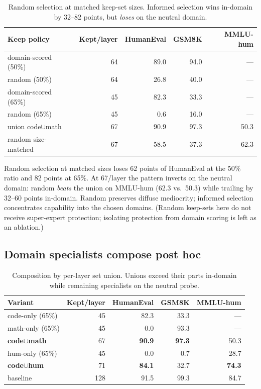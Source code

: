 \documentclass[11pt]{article}
\begin{document}
\begin{table}[h]
\centering
\begin{tabular}{lrrrr}
\toprule
Keep policy & Kept/layer & HumanEval & GSM8K & MMLU-hum \\
\midrule
domain-scored (50\%)   & 64 & 89.0 & 94.0 & --- \\
random (50\%)          & 64 & 26.8 & 40.0 & --- \\
domain-scored (65\%)   & 45 & 82.3 & 33.3 & --- \\
random (65\%)          & 45 &  0.6 & 16.0 & --- \\
union code$\cup$math   & 67 & 90.9 & 97.3 & 50.3 \\
random size-matched    & 67 & 58.5 & 37.3 & 62.3 \\
\bottomrule
\end{tabular}
\caption{Random selection at matched keep-set sizes. Informed selection wins
in-domain by 32--82 points, but \emph{loses} on the neutral domain.}
\end{table}

Random selection at matched sizes loses 62 points of HumanEval at the 50\%
ratio and 82 points at 65\%. At 67/layer the pattern inverts on the neutral
domain: random \emph{beats} the union on MMLU-hum (62.3 vs.\ 50.3) while
trailing by 32--60 points in-domain. Random preserves diffuse mediocrity;
informed selection concentrates capability into the chosen domains. (Random
keep-sets here do not receive super-expert protection; isolating protection
from domain scoring is left as an ablation.)

\subsection{Domain specialists compose post hoc}

\begin{table}[h]
\centering
\begin{tabular}{lrrrr}
\toprule
Variant & Kept/layer & HumanEval & GSM8K & MMLU-hum \\
\midrule
code-only (65\%)          &  45 & 82.3 & 33.3 & --- \\
math-only (65\%)          &  45 &  0.0 & 93.3 & --- \\
\textbf{code$\cup$math}   &  67 & \textbf{90.9} & \textbf{97.3} & 50.3 \\
hum-only (65\%)           &  45 &  0.0 &  0.7 & 28.7 \\
\textbf{code$\cup$hum}    &  71 & \textbf{84.1} & 32.7 & \textbf{74.3} \\
baseline                  & 128 & 91.5 & 99.3 & 84.7 \\
\bottomrule
\end{tabular}
\caption{Composition by per-layer set union. Unions exceed their parts
in-domain while remaining specialists on the neutral probe.}
\end{table}
\end{document}

